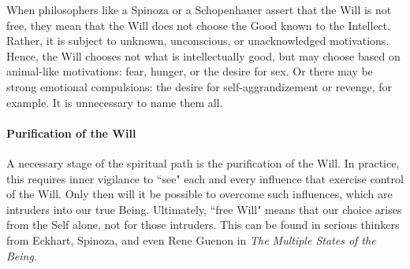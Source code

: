 When philosophers like a Spinoza or a Schopenhauer assert that the Will is not free, they mean that the Will does not choose the Good known to the Intellect. Rather, it is subject to unknown, unconscious, or unacknowledged motivations. Hence, the Will chooses not what is intellectually good, but may choose based on animal-like motivations: fear, hunger, or the desire for sex. Or there may be strong emotional compulsions: the desire for self-aggrandizement or revenge, for example. It is unnecessary to name them all.

\paragraph{Purification of the Will}
A necessary stage of the spiritual path is the purification of the Will. In practice, this requires inner vigilance to ``see" each and every influence that exercise control of the Will. Only then will it be possible to overcome such influences, which are intruders into our true Being. Ultimately, ``free Will" means that our choice arises from the Self alone, not for those intruders. This can be found in serious thinkers from Eckhart, Spinoza, and even Rene Guenon in \emph{The Multiple States of the Being}.

